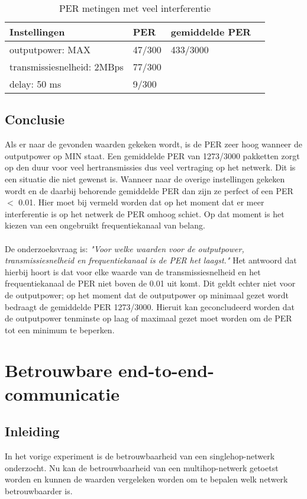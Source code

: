 \documentclass{article}
\begin{document}
\begin{table}[h]
\centering \caption{PER metingen met veel interferentie}
\label{table:interferentie}
\begin{tabular}{ | l | l | l | p{5cm} |}
    \hline
    Instellingen				& PER 		& gemiddelde PER\\ \hline
    outputpower: MAX 			& 47/300 	& 433/3000		\\ 
    transmissiesnelheid: 2MBps 	& 77/300 	&  				\\ 
    delay: 50 ms 				& 9/300 	&  				\\ \hline
\end{tabular}
\end{table}

\subsection{Conclusie}
Als er naar de gevonden waarden gekeken wordt, is de PER zeer hoog wanneer de outputpower op MIN staat. Een gemiddelde PER van 1273/3000 pakketten zorgt op den duur voor veel hertransmissies dus veel vertraging op het netwerk. Dit is een situatie die niet gewenst is. Wanneer naar de overige instellingen gekeken wordt en de daarbij behorende gemiddelde PER dan zijn ze perfect of een PER $<$ 0.01. Hier moet bij vermeld worden dat op het moment dat er meer interferentie is op het netwerk de PER omhoog schiet. Op dat moment is het kiezen van een ongebruikt frequentiekanaal van belang.\\
\\
De onderzoeksvraag is: \textit{"Voor welke waarden voor de outputpower, transmissiesnelheid en frequentiekanaal is de PER het laagst."} Het antwoord dat hierbij hoort is dat voor elke waarde van de transmissiesnelheid en het frequentiekanaal de PER niet boven de 0.01 uit komt. Dit geldt echter niet voor de outputpower; op het moment dat de outputpower op minimaal gezet wordt bedraagt de gemiddelde PER 1273/3000. Hieruit kan geconcludeerd worden dat de outputpower tenminste op laag of maximaal gezet moet worden om de PER tot een minimum te beperken. 

\newpage

\clearpage
\section{Betrouwbare end-to-end-communicatie}

\subsection{Inleiding}
In het vorige experiment is de betrouwbaarheid van een singlehop-netwerk onderzocht. Nu kan de betrouwbaarheid van een multihop-netwerk getoetst worden en kunnen de waarden vergeleken worden om te bepalen welk netwerk betrouwbaarder is. 
\end{document}
